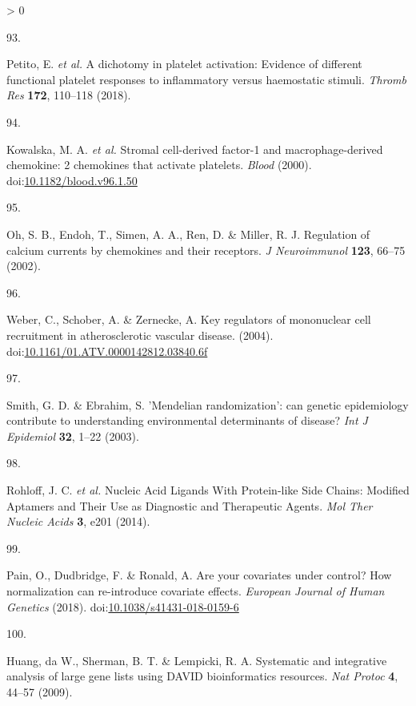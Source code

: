\documentclass[11pt,twoside]{bristolthesis}
\newlength{\cslhangindent}
\newlength{\csllabelwidth}
\newenvironment{CSLReferences}[2] %
 {%
  \setlength{\parindent}{0pt}
  \ifodd #1 \everypar{\setlength{\hangindent}{\cslhangindent}}\ignorespaces\fi
  \ifnum #2 > 0
  \setlength{\parskip}{#2\baselineskip}
  \fi
 }%
 {}
\newcommand{\CSLLeftMargin}[1]{\parbox[t]{\csllabelwidth}{#1}}
\newcommand{\CSLRightInline}[1]{\parbox[t]{\linewidth - \csllabelwidth}{#1}\break}
\begin{document}
\begin{CSLReferences}{0}{0}
\leavevmode\hypertarget{ref-Petito2018}{}%
\CSLLeftMargin{93. }
\CSLRightInline{Petito, E. \emph{et al.} {A dichotomy in platelet activation: Evidence of different functional platelet responses to inflammatory versus haemostatic stimuli}. \emph{Thromb Res} \textbf{172}, 110--118 (2018).}

\leavevmode\hypertarget{ref-Kowalska2000}{}%
\CSLLeftMargin{94. }
\CSLRightInline{Kowalska, M. A. \emph{et al.} {Stromal cell-derived factor-1 and macrophage-derived chemokine: 2 chemokines that activate platelets}. \emph{Blood} (2000). doi:\href{https://doi.org/10.1182/blood.v96.1.50}{10.1182/blood.v96.1.50}}

\leavevmode\hypertarget{ref-Oh2002}{}%
\CSLLeftMargin{95. }
\CSLRightInline{Oh, S. B., Endoh, T., Simen, A. A., Ren, D. \& Miller, R. J. {Regulation of calcium currents by chemokines and their receptors}. \emph{J Neuroimmunol} \textbf{123}, 66--75 (2002).}

\leavevmode\hypertarget{ref-Weber2004}{}%
\CSLLeftMargin{96. }
\CSLRightInline{Weber, C., Schober, A. \& Zernecke, A. {Key regulators of mononuclear cell recruitment in atherosclerotic vascular disease}. (2004). doi:\href{https://doi.org/10.1161/01.ATV.0000142812.03840.6f}{10.1161/01.ATV.0000142812.03840.6f}}

\leavevmode\hypertarget{ref-Smith2003}{}%
\CSLLeftMargin{97. }
\CSLRightInline{Smith, G. D. \& Ebrahim, S. {'Mendelian randomization': can genetic epidemiology contribute to understanding environmental determinants of disease?} \emph{Int J Epidemiol} \textbf{32}, 1--22 (2003).}

\leavevmode\hypertarget{ref-Rohloff2014}{}%
\CSLLeftMargin{98. }
\CSLRightInline{Rohloff, J. C. \emph{et al.} {Nucleic Acid Ligands With Protein-like Side Chains: Modified Aptamers and Their Use as Diagnostic and Therapeutic Agents}. \emph{Mol Ther Nucleic Acids} \textbf{3}, e201 (2014).}

\leavevmode\hypertarget{ref-Pain2018}{}%
\CSLLeftMargin{99. }
\CSLRightInline{Pain, O., Dudbridge, F. \& Ronald, A. {Are your covariates under control? How normalization can re-introduce covariate effects}. \emph{European Journal of Human Genetics} (2018). doi:\href{https://doi.org/10.1038/s41431-018-0159-6}{10.1038/s41431-018-0159-6}}

\leavevmode\hypertarget{ref-Huang2009}{}%
\CSLLeftMargin{100. }
\CSLRightInline{Huang, da W., Sherman, B. T. \& Lempicki, R. A. {Systematic and integrative analysis of large gene lists using DAVID bioinformatics resources}. \emph{Nat Protoc} \textbf{4}, 44--57 (2009).}


\end{CSLReferences}
\end{document}
